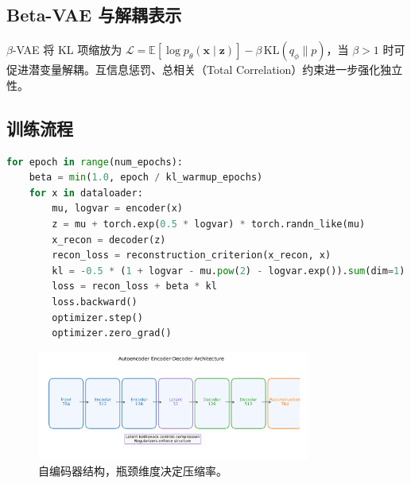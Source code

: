 \documentclass[UTF8,zihao=-4]{ctexart}
\begin{document}
\subsection{Beta-VAE 与解耦表示}
$\beta$-VAE 将 KL 项缩放为 $\mathcal{L} = \mathbb{E}[\log p_\theta(\mathbf{x} \mid \mathbf{z})] - \beta\,\mathrm{KL}(q_\phi \| p)$，当 $\beta > 1$ 时可促进潜变量解耦。互信息惩罚、总相关（Total Correlation）约束进一步强化独立性。

\subsection{训练流程}
\begin{lstlisting}[language=Python, caption={带 KL 预热的 VAE 训练循环。}]
for epoch in range(num_epochs):
    beta = min(1.0, epoch / kl_warmup_epochs)
    for x in dataloader:
        mu, logvar = encoder(x)
        z = mu + torch.exp(0.5 * logvar) * torch.randn_like(mu)
        x_recon = decoder(z)
        recon_loss = reconstruction_criterion(x_recon, x)
        kl = -0.5 * (1 + logvar - mu.pow(2) - logvar.exp()).sum(dim=1).mean()
        loss = recon_loss + beta * kl
        loss.backward()
        optimizer.step()
        optimizer.zero_grad()
\end{lstlisting}

\begin{figure}[H]
  \centering
  \includegraphics[width=0.8\textwidth]{autoencoder_architecture.png}
  \caption{自编码器结构，瓶颈维度决定压缩率。}
  \label{fig:autoencoder_architecture_cn}
\end{figure}
\end{document}
